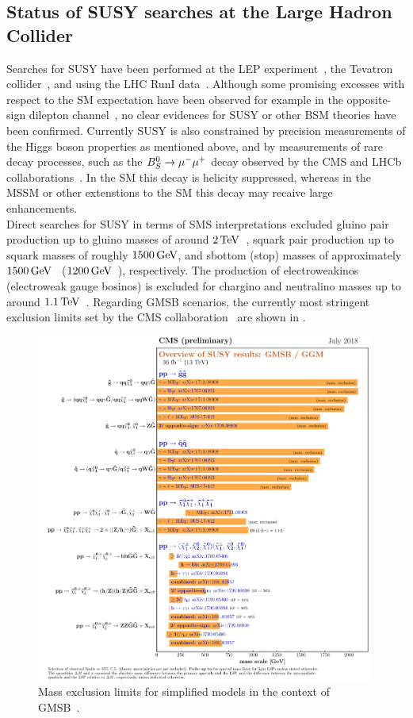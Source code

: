 \subsection{Status of SUSY searches at the Large Hadron Collider}
Searches for SUSY have been performed  at the LEP experiment~\cite{LEP}, the Tevatron collider~\cite{TEVATRON}, and using the LHC RunI data~\cite{ChristianRunI}. Although some promising excesses with respect to the SM expectation have been observed for example in the opposite-sign dilepton channel~\cite{Edge}, no clear evidences for SUSY or other BSM theories have been confirmed. Currently SUSY is also constrained by precision measurements of the Higgs boson properties as mentioned above, and by measurements of rare decay processes, such as the $B_S^0\to{\mu^-}{\mu^+}$ decay observed by the CMS and LHCb collaborations~\cite{B0S}. In the SM this decay is helicity suppressed, whereas in the MSSM or other extenstions to the SM this decay may recaive large enhancements.\\
Direct searches for SUSY in terms of SMS interpretations excluded gluino pair production up to gluino masses of around $2\,\text{Te\hspace{-.08em}V}$~\cite{GluinoCMS}, squark pair production up to squark masses of roughly $1500\,\text{Ge\hspace{-.08em}V}$, and sbottom (stop) masses of approximately $1500\,\text{Ge\hspace{-.08em}V}$~\cite{sbottom} ($1200\,\text{Ge\hspace{-.08em}V}$~\cite{stop}), respectively. The production of electroweakinos (electroweak gauge bosinos) is excluded for chargino and neutralino masses up to around $1.1\,\text{Te\hspace{-.08em}V}$~\cite{EWKinos}.
Regarding GMSB scenarios, the currently most stringent exclusion limits set by the CMS collaboration~\cite{CMS} are shown in .
\begin{figure}[tbp]
 \centering
 \includegraphics[width=0.99\textwidth]{figures/general/barplot_GMSB}
 \caption{Mass exclusion limits for simplified models in the context of GMSB~\cite{SUSSummaryPlot}.}
 \label{fig:GMSB_summary}
\end{figure}
